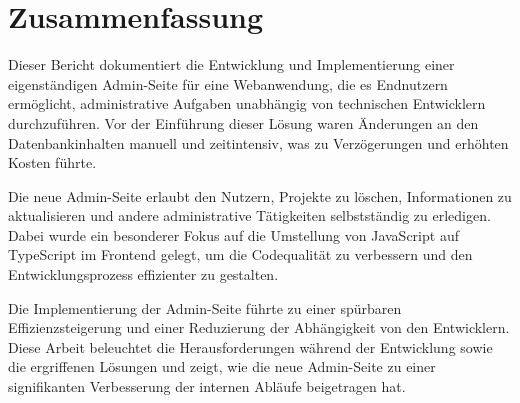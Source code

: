 \section{Zusammenfassung}
Dieser Bericht dokumentiert die Entwicklung und Implementierung einer eigenständigen Admin-Seite für eine Webanwendung, die es Endnutzern ermöglicht, administrative Aufgaben unabhängig von technischen Entwicklern durchzuführen.
Vor der Einführung dieser Lösung waren Änderungen an den Datenbankinhalten manuell und zeitintensiv, was zu Verzögerungen und erhöhten Kosten führte.

Die neue Admin-Seite erlaubt den Nutzern, Projekte zu löschen, Informationen zu aktualisieren und andere administrative Tätigkeiten selbstständig zu erledigen.
Dabei wurde ein besonderer Fokus auf die Umstellung von JavaScript auf TypeScript im Frontend gelegt, um die Codequalität zu verbessern und den Entwicklungsprozess effizienter zu gestalten.

Die Implementierung der Admin-Seite führte zu einer spürbaren Effizienzsteigerung und einer Reduzierung der Abhängigkeit von den Entwicklern.
Diese Arbeit beleuchtet die Herausforderungen während der Entwicklung sowie die ergriffenen Lösungen und zeigt, wie die neue Admin-Seite zu einer signifikanten Verbesserung der internen Abläufe beigetragen hat.